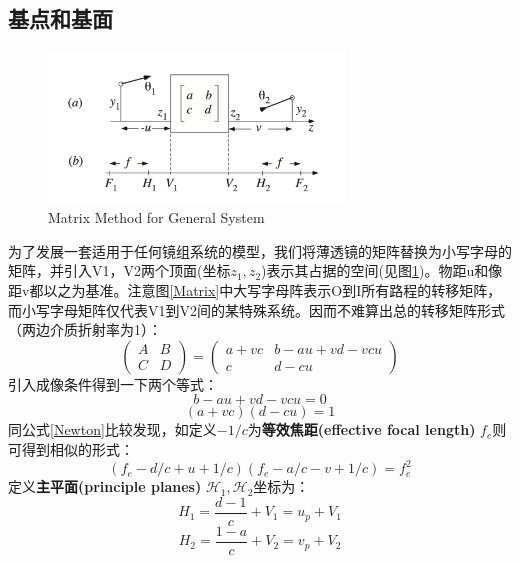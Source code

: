 \documentclass[12pt]{ctexart}%
\begin{document}
\subsection*{基点和基面}
\begin{figure}[t] %
    \centering
    \includegraphics[width=0.7\textwidth]{Image/2_Matrix2.png}
    \caption{Matrix Method for General System}
    \label{Matrix2}
\end{figure}
为了发展一套适用于任何镜组系统的模型，我们将薄透镜的矩阵替换为小写字母的矩阵，并引入V1，V2两个顶面(坐标$z_1,z_2$)表示其占据的空间(见图\ref{Matrix2})。物距u和像距v都以之为基准。注意图\ref{Matrix}中大写字母阵表示O到I所有路程的转移矩阵，而小写字母矩阵仅代表V1到V2间的某特殊系统。因而不难算出总的转移矩阵形式（两边介质折射率为1）：
\begin{equation}
    \begin{pmatrix}
        A & B \\
        C & D
    \end{pmatrix}=\begin{pmatrix}
        a+vc & b-au+vd-vcu \\
        c & d-cu
    \end{pmatrix}
\end{equation}
引入成像条件得到一下两个等式：
\begin{equation}
    b-au+vd-vcu=0
\end{equation}
\begin{equation}
    (a+vc)(d-cu)=1
\end{equation}
同公式\ref{Newton}比较发现，如定义$-1/c$为\textbf{等效焦距(effective focal length)} $f_{e}$则可得到相似的形式：
\begin{equation}
    (f_e-d/c+u+1/c)(f_e-a/c-v+1/c)=f_{e}^2
\end{equation}
定义\textbf{主平面(principle planes)} $\mathcal{H}_1,\mathcal{H}_2$坐标为：
\begin{equation}
    {H}_1=\frac{d-1}{c}+V_1=u_p+V_1
\end{equation}
\begin{equation}
    {H}_2=\frac{1-a}{c}+V_2=v_p+V_2
\end{equation}
\end{document}
